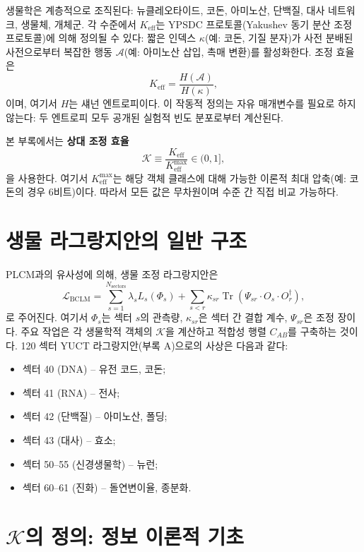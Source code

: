 \documentclass[12pt,a4paper]{article}
\newcommand{\REL}{\mathcal{K}}          %
\begin{document}
	생물학은 계층적으로 조직된다: 뉴클레오타이드, 코돈, 아미노산, 단백질, 대사 네트워크, 생물체, 개체군. 각 수준에서 \(K_{\mathrm{eff}}\)는 YPSDC 프로토콜(Yakushev 동기 분산 조정 프로토콜)에 의해 정의될 수 있다: 짧은 인덱스 \(\kappa\)(예: 코돈, 기질 분자)가 사전 분배된 사전으로부터 복잡한 행동 \(\mathcal{A}\)(예: 아미노산 삽입, 촉매 변환)를 활성화한다. 조정 효율은
	\[
	K_{\mathrm{eff}} = \frac{H(\mathcal{A})}{H(\kappa)},
	\]
	이며, 여기서 \(H\)는 섀넌 엔트로피이다. 이 작동적 정의는 자유 매개변수를 필요로 하지 않는다: 두 엔트로피 모두 공개된 실험적 빈도 분포로부터 계산된다.
	
	본 부록에서는 \textbf{상대 조정 효율}
	\[
	\REL \equiv \frac{K_{\mathrm{eff}}}{K_{\mathrm{eff}}^{\max}} \in (0,1],
	\]
	을 사용한다. 여기서 \(K_{\mathrm{eff}}^{\max}\)는 해당 객체 클래스에 대해 가능한 이론적 최대 압축(예: 코돈의 경우 6비트)이다. 따라서 모든 값은 무차원이며 수준 간 직접 비교 가능하다.
	
	\section{생물 라그랑지안의 일반 구조}
	PLCM과의 유사성에 의해, 생물 조정 라그랑지안은
	\begin{equation}
		\mathcal{L}_{\text{BCLM}} = \sum_{s=1}^{N_{\text{sectors}}} \lambda_s L_s(\Phi_s) + \sum_{s<r} \kappa_{sr} \operatorname{Tr}(\Psi_{sr} \cdot O_s \cdot O_r^\dagger),
		\label{eq:BCLM}
	\end{equation}
	로 주어진다. 여기서 \(\Phi_s\)는 섹터 \(s\)의 관측량, \(\kappa_{sr}\)은 섹터 간 결합 계수, \(\Psi_{sr}\)은 조정 장이다. 주요 작업은 각 생물학적 객체의 \(\REL\)을 계산하고 적합성 행렬 \(C_{AB}\)를 구축하는 것이다. 120 섹터 YUCT 라그랑지안(부록 A)으로의 사상은 다음과 같다:
	\begin{itemize}
		\item 섹터 40 (DNA) – 유전 코드, 코돈;
		\item 섹터 41 (RNA) – 전사;
		\item 섹터 42 (단백질) – 아미노산, 폴딩;
		\item 섹터 43 (대사) – 효소;
		\item 섹터 50–55 (신경생물학) – 뉴런;
		\item 섹터 60–61 (진화) – 돌연변이율, 종분화.
	\end{itemize}
	
	\section{\(\REL\)의 정의: 정보 이론적 기초}
	\label{sec:REL-def}
	
\end{document}
